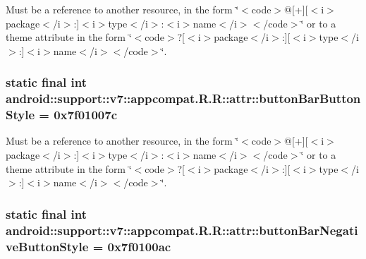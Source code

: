 Must be a reference to another resource, in the form \char`\"{}$<$code$>$@\mbox{[}+\mbox{]}\mbox{[}$<$i$>$package$<$/i$>$:\mbox{]}$<$i$>$type$<$/i$>$:$<$i$>$name$<$/i$>$$<$/code$>$\char`\"{} or to a theme attribute in the form \char`\"{}$<$code$>$?\mbox{[}$<$i$>$package$<$/i$>$:\mbox{]}\mbox{[}$<$i$>$type$<$/i$>$:\mbox{]}$<$i$>$name$<$/i$>$$<$/code$>$\char`\"{}. \hypertarget{classandroid_1_1support_1_1v7_1_1appcompat_1_1_r_1_1attr_1013622db563c96601caa7eb7ecc2e41}{
\subsubsection[{buttonBarButtonStyle}]{\setlength{\rightskip}{0pt plus 5cm}static final int android::support::v7::appcompat.R.R::attr::buttonBarButtonStyle = 0x7f01007c}}
\label{classandroid_1_1support_1_1v7_1_1appcompat_1_1_r_1_1attr_1013622db563c96601caa7eb7ecc2e41}


Must be a reference to another resource, in the form \char`\"{}$<$code$>$@\mbox{[}+\mbox{]}\mbox{[}$<$i$>$package$<$/i$>$:\mbox{]}$<$i$>$type$<$/i$>$:$<$i$>$name$<$/i$>$$<$/code$>$\char`\"{} or to a theme attribute in the form \char`\"{}$<$code$>$?\mbox{[}$<$i$>$package$<$/i$>$:\mbox{]}\mbox{[}$<$i$>$type$<$/i$>$:\mbox{]}$<$i$>$name$<$/i$>$$<$/code$>$\char`\"{}. \hypertarget{classandroid_1_1support_1_1v7_1_1appcompat_1_1_r_1_1attr_ede931ebbb2ff999a40b22a7f918aa8f}{
\subsubsection[{buttonBarNegativeButtonStyle}]{\setlength{\rightskip}{0pt plus 5cm}static final int android::support::v7::appcompat.R.R::attr::buttonBarNegativeButtonStyle = 0x7f0100ac}}
\label{classandroid_1_1support_1_1v7_1_1appcompat_1_1_r_1_1attr_ede931ebbb2ff999a40b22a7f918aa8f}


